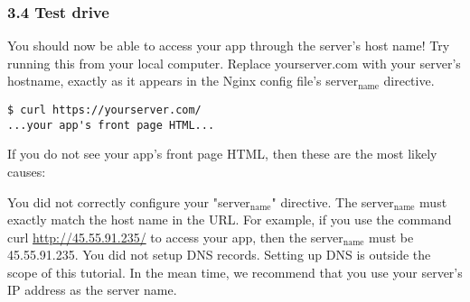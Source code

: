 \documentclass[11pt]{article}
\begin{document}
\subsubsection{3.4 Test drive}
\label{sec:org86f55d9}

You should now be able to access your app through the server's host name! Try running this from your local computer. Replace yourserver.com with your server's hostname, exactly as it appears in the Nginx config file's server\(_{\text{name}}\) directive.

\begin{verbatim}
$ curl https://yourserver.com/
...your app's front page HTML...
\end{verbatim}

If you do not see your app's front page HTML, then these are the most likely causes:

You did not correctly configure your "server\(_{\text{name}}\)" directive. The server\(_{\text{name}}\) must exactly match the host name in the URL. For example, if you use the command curl \url{http://45.55.91.235/} to access your app, then the server\(_{\text{name}}\) must be 45.55.91.235.
You did not setup DNS records. Setting up DNS is outside the scope of this tutorial. In the mean time, we recommend that you use your server's IP address as the server name.
\end{document}
